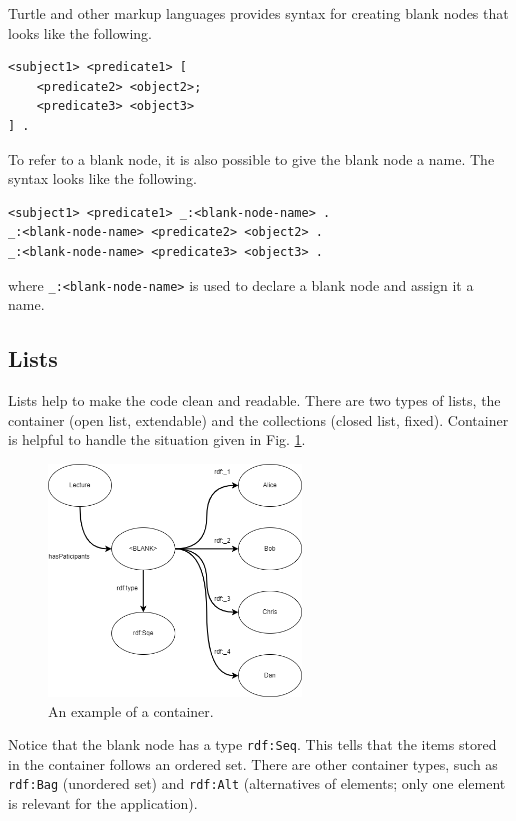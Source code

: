 Turtle and other markup languages provides syntax for creating blank nodes that looks like the following.
\begin{lstlisting}
<subject1> <predicate1> [
	<predicate2> <object2>;
	<predicate3> <object3>
] .
\end{lstlisting}
To refer to a blank node, it is also possible to give the blank node a name. The syntax looks like the following.
\begin{lstlisting}
<subject1> <predicate1> _:<blank-node-name> .
_:<blank-node-name> <predicate2> <object2> .
_:<blank-node-name> <predicate3> <object3> .
\end{lstlisting}
where \verb|_:<blank-node-name>| is used to declare a blank node and assign it a name.

\subsection{Lists}

Lists help to make the code clean and readable. There are two types of lists, the container (open list, extendable) and the collections (closed list, fixed). Container is helpful to handle the situation given in Fig.  \ref{fig:lectureexp3}.
\begin{figure}[htbp]
	\centering
	\includegraphics[width=0.6\textwidth]{./chapters/ch-semanticwebarchitecture/figures/lectureexp3.png}
	\caption{An example of a container.}
	\label{fig:lectureexp3}
\end{figure}
Notice that the blank node has a type \verb|rdf:Seq|. This tells that the items stored in the container follows an ordered set. There are other container types, such as \verb|rdf:Bag| (unordered set) and \verb|rdf:Alt| (alternatives of elements; only one element is relevant for the application).

